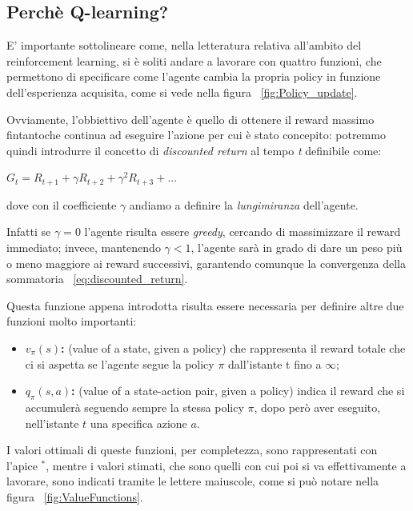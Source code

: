 \subsection{Perchè Q-learning?}
E' importante sottolineare come, nella letteratura relativa all'ambito del reinforcement learning, si è soliti andare a lavorare con quattro funzioni, che permettono di specificare come l'agente cambia la propria policy in funzione dell'esperienza acquisita, come si vede nella figura ~\ref{fig:Policy_update}.

Ovviamente, l'obbiettivo dell'agente è quello di ottenere il reward massimo fintantoche continua ad eseguire l'azione per cui è stato concepito: potremmo quindi introdurre il concetto di \textit{discounted return} al tempo \textit{t} definibile come:

\begin{center}
	$G_t = R_{t+1} + \gamma R_{t+2}+ \gamma^2 R_{t+3} + ...$
	\label{eq:discounted_return}
\end{center}

dove con il coefficiente $\gamma$ andiamo a definire la \textit{lungimiranza} dell'agente.

Infatti se $\gamma = 0$ l'agente risulta essere \textit{greedy}, cercando di massimizzare il reward immediato; invece, mantenendo $\gamma < 1$, l'agente sarà in grado di dare un peso più o meno maggiore ai reward successivi, garantendo comunque la convergenza della sommatoria ~\ref{eq:discounted_return}.

Questa funzione appena introdotta risulta essere necessaria per definire altre due funzioni molto importanti:
\begin{itemize}
	\item \textbf{$v_\pi(s)$: }(value of a state, given a policy) che rappresenta il reward totale che ci si aspetta se l'agente segue la policy $\pi$ dall'istante t fino a $\infty$;
	\item \textbf{$q_\pi(s,a)$: }(value of a state-action pair, given a policy) indica il reward che si accumulerà seguendo sempre la stessa policy $\pi$, dopo però aver eseguito, nell'istante $t$ una specifica azione $a$.
\end{itemize}

I valori ottimali di queste funzioni, per completezza, sono rappresentati con l'apice $^*$, mentre i valori stimati, che sono quelli con cui poi si va effettivamente a lavorare, sono indicati tramite le lettere maiuscole, come si può notare nella figura ~\ref{fig:ValueFunctions}.

